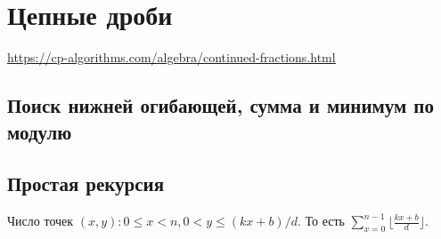 \section{Цепные дроби}
\underline{\url{https://cp-algorithms.com/algebra/continued-fractions.html}}
\subsection{Поиск нижней огибающей, сумма и минимум по модулю}

\subsection{Простая рекурсия}
Число точек $(x, y) : 0 \leqslant x < n, 0 < y \leqslant (kx + b) / d$.
То есть $\sum\limits_{x=0}^{n-1} \lfloor\frac{kx+b}{d}\rfloor$.
